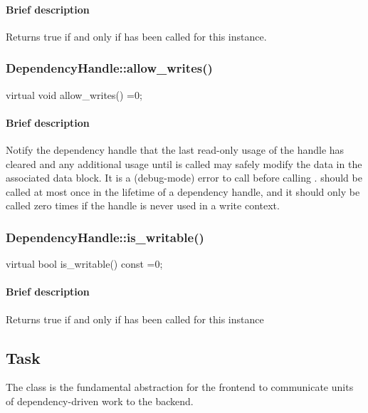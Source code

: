 \paragraph{Brief description} Returns true if and only if  has been called for this instance.


\subsubsection{DependencyHandle::allow\_writes()}
\begin{CppCode}
    virtual void
    allow_writes() =0;
\end{CppCode}

\paragraph{Brief description} Notify the dependency handle that the last read-only usage of the handle has cleared
       and any additional usage until  is called may safely modify the
       data in the associated data block.
       It is a (debug-mode) error to call  before calling .
        should be called at most once in the lifetime of a dependency handle, and
       it should only be called zero times if the handle is never used in a write context.


\subsubsection{DependencyHandle::is\_writable()}
\begin{CppCode}
    virtual bool
    is_writable() const =0;
\end{CppCode}

\paragraph{Brief description} Returns true if and only if  has been called for this instance
     

\subsection{{Task}}
The class  is the fundamental abstraction for the frontend to communicate units of
  dependency-driven work to the backend.


